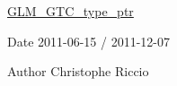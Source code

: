 \hyperlink{group__gtc__type__ptr}{G\+L\+M\+\_\+\+G\+T\+C\+\_\+type\+\_\+ptr}

\begin{DoxyDate}{Date}
2011-\/06-\/15 / 2011-\/12-\/07 
\end{DoxyDate}
\begin{DoxyAuthor}{Author}
Christophe Riccio 
\end{DoxyAuthor}
